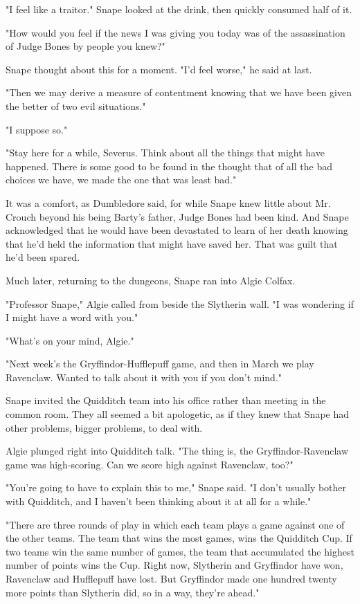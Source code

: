 "I feel like a traitor." Snape looked at the drink, then quickly consumed half of it.

"How would you feel if the news I was giving you today was of the assassination of Judge Bones by people you knew?"

Snape thought about this for a moment. "I'd feel worse," he said at last.

"Then we may derive a measure of contentment knowing that we have been given the better of two evil situations."

"I suppose so."

"Stay here for a while, Severus. Think about all the things that might have happened. There is some good to be found in the thought that of all the bad choices we have, we made the one that was least bad."

It was a comfort, as Dumbledore said, for while Snape knew little about Mr. Crouch beyond his being Barty's father, Judge Bones had been kind. And Snape acknowledged that he would have been devastated to learn of her death knowing that he'd held the information that might have saved her. That was guilt that he'd been spared.

Much later, returning to the dungeons, Snape ran into Algie Colfax.

"Professor Snape," Algie called from beside the Slytherin wall. "I was wondering if I might have a word with you."

"What's on your mind, Algie."

"Next week's the Gryffindor-Hufflepuff game, and then in March we play Ravenclaw. Wanted to talk about it with you if you don't mind."

Snape invited the Quidditch team into his office rather than meeting in the common room. They all seemed a bit apologetic, as if they knew that Snape had other problems, bigger problems, to deal with.

Algie plunged right into Quidditch talk. "The thing is, the Gryffindor-Ravenclaw game was high-scoring. Can we score high against Ravenclaw, too?"

"You're going to have to explain this to me," Snape said. "I don't usually bother with Quidditch, and I haven't been thinking about it at all for a while."

"There are three rounds of play in which each team plays a game against one of the other teams. The team that wins the most games, wins the Quidditch Cup. If two teams win the same number of games, the team that accumulated the highest number of points wins the Cup. Right now, Slytherin and Gryffindor have won, Ravenclaw and Hufflepuff have lost. But Gryffindor made one hundred twenty more points than Slytherin did, so in a way, they're ahead."

